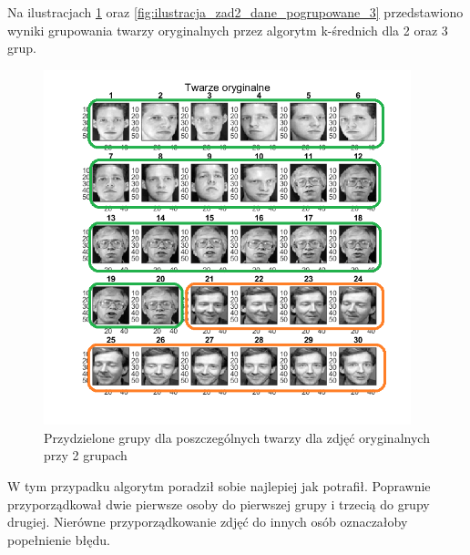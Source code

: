 \documentclass[11pt, a4paper]{article}
\newcommand{\fbi}{\leavevmode{\parindent=1em\indent}}
\begin{document}
\fbi
Na ilustracjach \ref{fig:ilustracja_zad2_dane_pogrupowane_2} oraz \ref{fig:ilustracja_zad2_dane_pogrupowane_3} przedstawiono wyniki grupowania twarzy oryginalnych przez algorytm k-średnich dla 2 oraz 3 grup.

\begin{figure}[H]
	\centering
	\includegraphics[width=0.95\textwidth]{./assets/ilustracja_zad2_dane_pogrupowane_2.png}
	\caption{Przydzielone grupy dla poszczególnych twarzy dla zdjęć oryginalnych przy 2 grupach}
	\label{fig:ilustracja_zad2_dane_pogrupowane_2}
\end{figure}

\fbi
W tym przypadku algorytm poradził sobie najlepiej jak potrafił. Poprawnie przyporządkował dwie pierwsze osoby do pierwszej grupy i trzecią do grupy drugiej. Nierówne przyporządkowanie zdjęć do innych osób oznaczałoby popełnienie błędu.
\end{document}
